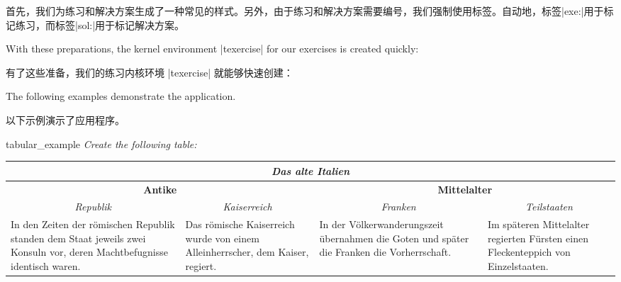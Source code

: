 首先，我们为练习和解决方案生成了一种常见的样式。另外，由于练习和解决方案需要编号，我们强制使用标签。自动地，标签|exe:|用于标记练习，而标签|sol:|用于标记解决方案。

\begin{dispListing}
\end{dispListing}
\tcbusetemp

With these preparations, the kernel environment |texercise| for our
exercises is created quickly:

有了这些准备，我们的练习内核环境 |texercise| 就能够快速创建：


The following examples demonstrate the application.

以下示例演示了应用程序。

\begin{dispListing}
\tcbstartrecording
\end{dispListing}
\tcbusetemp


\begin{dispExample}
\begin{texercise}{tabular_example}
\textit{Create the following table:}\par\smallskip%
\begin{tcboutputlisting}
\begin{tabular}{|p{3cm}|p{3cm}|p{3cm}|p{3cm}|}\hline
\multicolumn{4}{|c|}{\bfseries\itshape Das alte Italien}\\\hline
\multicolumn{2}{|c|}{\bfseries Antike} &
\multicolumn{2}{c|}{\bfseries Mittelalter}\\\hline
\multicolumn{1}{|c|}{\itshape Republik}&
\multicolumn{1}{c|}{\itshape Kaiserreich}&
\multicolumn{1}{c|}{\itshape Franken}&
\multicolumn{1}{c|}{\itshape Teilstaaten}\\\hline
In den Zeiten der r\"{o}mischen Republik standen dem Staat jeweils zwei
Konsuln vor, deren Machtbefugnisse identisch waren. &
Das r\"{o}mische Kaiserreich wurde von einem Alleinherrscher, dem Kaiser,
regiert.
& In der V\"{o}lkerwanderungszeit \"{u}bernahmen die Goten und sp\"{a}ter die
Franken die Vorherrschaft.
& Im sp\"{a}teren Mittelalter regierten F\"{u}rsten einen Fleckenteppich
von Einzelstaaten.\\\hline
\end{tabular}
\end{tcboutputlisting}
\tcbuselistingtext%
\end{texercise}
\end{dispExample}



